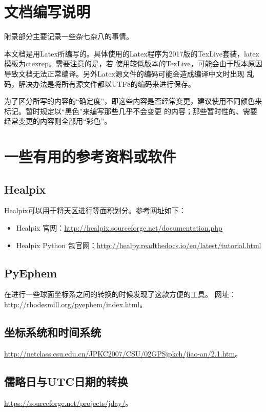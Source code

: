 
\begin{appendix}

\chapter{文档编写说明}
附录部分主要记录一些杂七杂八的事情。

本文档是用Latex所编写的。具体使用的Latex程序为2017版的TexLive套装，latex模板为ctexrep。需要注意的是，若
使用较低版本的TexLive，可能会由于版本原因导致文档无法正常编译。另外Latex源文件的编码可能会造成编译中文时出现
乱码，解决办法是将所有源文件都以UTF8的编码来进行保存。

为了区分所写的内容的“确定度”，即这些内容是否经常变更，建议使用不同颜色来标记。暂时规定以“黑色”来编写那些几乎不会变更
的内容；那些暂时性的、需要经常变更的内容则全部用“彩色”。


\chapter{一些有用的参考资料或软件}

\section{Healpix}
Healpix可以用于将天区进行等面积划分。参考网址如下：
\begin{itemize}
\item Healpix 官网：\url{http://healpix.sourceforge.net/documentation.php}
\item Healpix Python 包官网：\url{http://healpy.readthedocs.io/en/latest/tutorial.html}
\end{itemize}

\section{PyEphem}
在进行一些球面坐标系之间的转换的时候发现了这款方便的工具。
网址：\url{http://rhodesmill.org/pyephem/index.html}。

\section{坐标系统和时间系统}
\url{http://netclass.csu.edu.cn/JPKC2007/CSU/02GPSjpkch/jiao-an/2.1.htm}。

\section{儒略日与UTC日期的转换}
\url{https://sourceforge.net/projects/jday/}。



\end{appendix}
